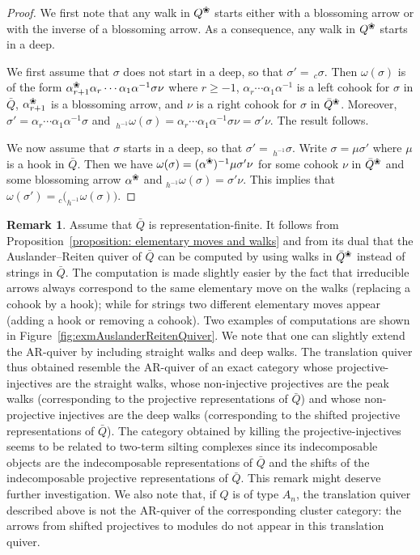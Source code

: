 \documentclass{memo-l}
\theoremstyle{definition}
\newtheorem{remark}[theorem]{Remark}
\newcommand{\blossom}{^\text{\ding{96}}} %
\begin{document}
\begin{proof}
We first note that any walk in $Q\blossom$ starts either with a blossoming arrow or with the inverse of a blossoming arrow.
As a consequence, any walk in $Q\blossom$ starts in a deep.

We first assume that $\sigma$ does not start in a deep, so that $\sigma'=\,_c\sigma$.
Then $\omega(\sigma)$ is of the form $\alpha_{r+1} \blossom \alpha_r \cdots \alpha_1 \alpha^{-1}\sigma\nu$ where $r\geq -1$, $\alpha_r\cdots\alpha_1\alpha^{-1}$ is a left cohook for $\sigma$ in $\bar Q$, $\alpha_{r+1}\blossom$ is a blossoming arrow, and $\nu$ is a right cohook for $\sigma$ in $\bar Q\blossom$.
Moreover, $\sigma'=\alpha_r\cdots\alpha_1\alpha^{-1}\sigma$ and $\,_{h^{-1}}\omega(\sigma) = \alpha_r\cdots\alpha_1\alpha^{-1}\sigma\nu = \sigma'\nu$.
The result follows.

We now assume that $\sigma$ starts in a deep, so that $\sigma'=\,_{h^{-1}}\sigma$.
Write $\sigma = \mu\sigma'$ where $\mu$ is a hook in $\bar Q$.
Then we have $\omega(\sigma)=(\alpha\blossom)^{-1}\mu\sigma'\nu$ for some cohook $\nu$ in $\bar Q\blossom$ and some blossoming arrow $\alpha\blossom$ and $_{h^{-1}}\omega(\sigma)=\sigma'\nu$.
This implies that $\omega(\sigma') = {}_c\big(_{h^{-1}}\omega(\sigma)\big)$.
\end{proof}

\begin{remark}
Assume that $\bar Q$ is representation-finite.
It follows from Proposition~\ref{proposition: elementary moves and walks} and from its dual that the Auslander--Reiten quiver of $\bar Q$ can be computed by using walks in $\bar Q\blossom$ instead of strings in $\bar Q$.
The computation is made slightly easier by the fact that irreducible arrows always correspond to the same elementary move on the walks (replacing a cohook by a hook); while for strings two different elementary moves appear (adding a hook or removing a cohook).
Two examples of computations are shown in Figure~\ref{fig:exmAuslanderReitenQuiver}.
We note that one can slightly extend the AR-quiver by including straight walks and deep walks.
The translation quiver thus obtained resemble the AR-quiver of an exact category whose projective-injectives are the straight walks, whose non-injective projectives are the peak walks (corresponding to the projective representations of $\bar Q$) and whose non-projective injectives are the deep walks (corresponding to the shifted projective representations of $\bar Q$).
The category obtained by killing the projective-injectives seems to be related to two-term silting complexes since its indecomposable objects are the indecomposable representations of $\bar Q$ and the shifts of the indecomposable projective representations of $\bar Q$.
This remark might deserve further investigation.
We also note that, if $Q$ is of type $A_n$, the translation quiver described above is not the AR-quiver of the corresponding cluster category:
the arrows from shifted projectives to modules do not appear in this translation quiver.
\end{remark}
\end{document}
